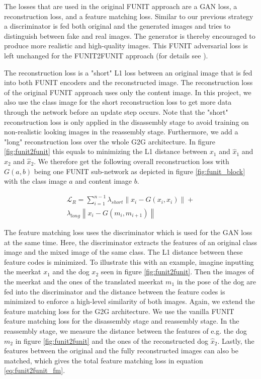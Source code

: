 \documentclass[conference]{IEEEtran}
\begin{document}
The losses that are used in the original FUNIT approach are a GAN loss, a reconstruction loss, and a feature matching loss. Similar to our previous strategy a discriminator is fed both original and the generated images and tries to distinguish between fake and real images. The generator is thereby encouraged to produce more realistic and high-quality images. This FUNIT adversarial loss is left unchanged for the FUNIT2FUNIT approach (for details see \cite{liu2019few}).

The reconstruction loss is a "short" L1 loss between an original image that is fed into both FUNIT encoders and the reconstructed image. The reconstruction loss of the original FUNIT approach uses only the content image. In this project, we also use the class image for the short reconstruction loss to get more data through the network before an update step occurs. Note that the "short" reconstruction loss is only applied in the disassembly stage to avoid training on non-realistic looking images in the reassembly stage. 
Furthermore, we add a "long" reconstruction loss over the whole G2G architecture. In figure \ref{fig:funit2funit} this equals to minimizing the L1 distance between $x_1$ and $\hat{x}_1$ and $x_2$ and $\hat{x}_2$. We therefore get the following overall reconstruction loss with $G(a,b)$ being one FUNIT sub-network as depicted in figure \ref{fig:funit_block} with the class image $a$ and content image $b$.

\begin{equation}
\begin{split}
	\mathcal{L}_{R} = \sum_{i=1}^{n-1}  \lambda_{short} \left\| x_i - G(x_i,{x_i}) \right\| +\\ \lambda_{long}
	\left\| x_i - G(m_i,m_{i+1}) \right\| 
	\label{eq:funit2funit_rec}
\end{split}
\end{equation}

The feature matching loss uses the discriminator which is used for the GAN loss at the same time. Here, the discriminator extracts the features of an original class image and the mixed image of the same class. The L1 distance between these feature codes is minimized. To illustrate this with an example, imagine inputting the meerkat $x_1$ and the dog $x_2$ seen in figure \ref{fig:funit2funit}. Then the images of the meerkat and the ones of the translated meerkat $m_1$ in the pose of the dog are fed into the discriminator and the distance between the feature codes is minimized to enforce a high-level similarity of both images.
Again, we extend the feature matching loss for the G2G architecture. We use the vanilla FUNIT feature matching loss for the disassembly stage and reassembly stage. In the reassembly stage, we measure the distance between the features of e.g. the dog $m_2$ in figure \ref{fig:funit2funit} and the ones of the reconstructed dog $\hat{x}_2$.
Lastly, the features between the original and the fully reconstructed images can also be matched, which gives the  total feature matching loss in equation \ref{eq:funit2funit_fm}. 
\end{document}
